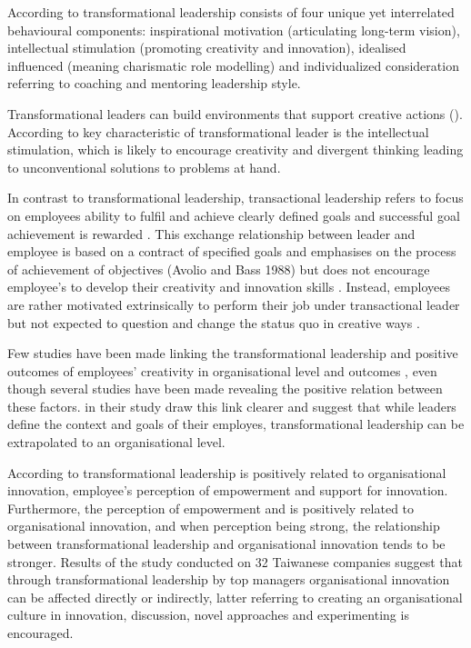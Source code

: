 According to \citet{bass1997full} transformational leadership consists of four unique yet interrelated behavioural components: inspirational motivation (articulating long-term vision), intellectual stimulation (promoting creativity and innovation), idealised influenced (meaning charismatic role modelling) and individualized consideration referring to coaching and mentoring leadership style. 

Transformational leaders can build environments that support creative actions (\citep{sosik1998transformational,avolio1988transformational}). According to \citet{sosik1998transformational} key characteristic of transformational leader is the intellectual stimulation, which is likely to encourage creativity and divergent thinking leading to unconventional solutions to problems at hand. 

In contrast to transformational leadership, transactional leadership refers to focus on employees ability to fulfil and achieve clearly defined goals \citep{hollander1978leadership,house1971path} and successful goal achievement is rewarded \citep{waldman1990adding}. This exchange relationship between leader and employee is based on a contract of specified goals and emphasises on the process of achievement of objectives (Avolio and Bass 1988) but does not encourage employee's to develop their creativity and innovation skills \citep{jung2001transformational}. Instead, employees are rather motivated extrinsically to perform their job under transactional leader but not expected to question and change the status quo in creative ways \citep{amabile1998kill}.  

Few studies have been made linking the transformational leadership and positive outcomes of employees' creativity in organisational level and outcomes \citep{jung2003role}, even though several studies have been made revealing the positive relation between these factors. in their study \citet{jung2003role} draw this link clearer and suggest that while leaders define the context and goals of their employes, transformational leadership can be extrapolated to an organisational level.  

According to \citet{jung2003role} transformational leadership is positively related to organisational innovation, employee's perception of empowerment and support for innovation. Furthermore, the perception of empowerment and is positively related to organisational innovation, and when perception being strong,  the relationship between transformational leadership and organisational innovation tends to be stronger. Results of the study conducted on 32 Taiwanese companies suggest that through transformational leadership by top managers organisational innovation can be affected directly or indirectly, latter referring to creating an organisational culture in innovation, discussion, novel approaches and experimenting is encouraged. \citep{jung2003role}

